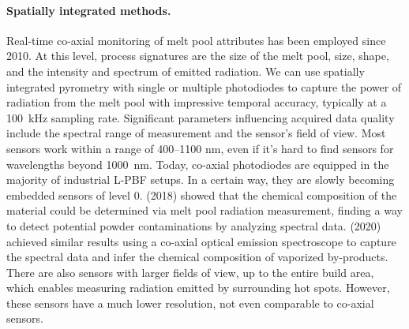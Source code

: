 \paragraph{Spatially integrated methods.} Real-time co-axial monitoring of melt pool attributes has been employed since 2010. At this level, process signatures are the size of the melt pool, size, shape, and the intensity and spectrum of emitted radiation. We can use spatially integrated pyrometry with single or multiple photodiodes to capture the power of radiation from the melt pool with impressive temporal accuracy, typically at a \SI{100}{\kilo\hertz} sampling rate. Significant parameters influencing acquired data quality include the spectral range of measurement and the sensor's field of view. Most sensors work within a range of \numrange{400}{1100} \unit{\nano\metre}, even if it's hard to find sensors for wavelengths beyond \SI{1000}{\nano\metre}. Today, co-axial photodiodes are equipped in the majority of industrial L-PBF setups. In a certain way, they are slowly becoming embedded sensors of level 0. \citeauthor{montazeri_-process_2018} (2018) showed that the chemical composition of the material could be determined via melt pool radiation measurement, finding a way to detect potential powder contaminations by analyzing spectral data. \citeauthor{lough_-situ_2020} (2020) achieved similar results using a co-axial optical emission spectroscope to capture the spectral data and infer the chemical composition of vaporized by-products. There are also sensors with larger fields of view, up to the entire build area, which enables measuring radiation emitted by surrounding hot spots. However, these sensors have a much lower resolution, not even comparable to co-axial sensors.
